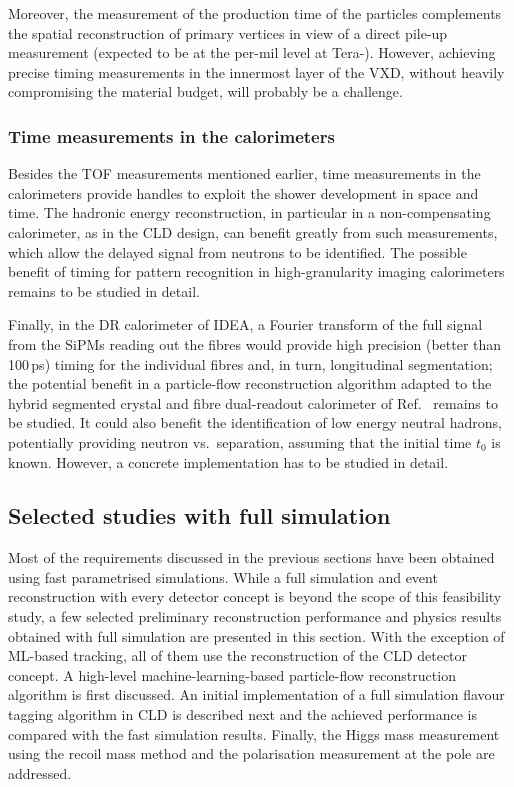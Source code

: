 Moreover, the measurement of the production time of the particles complements the spatial reconstruction of primary vertices in view of a direct pile-up measurement 
(expected to be at the per-mil level at Tera-\PZ). 
However, achieving precise timing measurements in the innermost layer of the VXD, without heavily compromising the material budget, will probably be a challenge.

\subsubsection{Time measurements in the calorimeters}

Besides the TOF measurements mentioned earlier, time measurements in the calorimeters provide handles to exploit the shower development in space and time. 
The hadronic energy reconstruction, in particular in a non-compensating calorimeter, as in the CLD design, can benefit greatly from such measurements, 
which allow the delayed signal from neutrons to be identified. 
The possible benefit of timing for pattern recognition in high-granularity imaging calorimeters remains to be studied in detail. 

Finally, in the DR calorimeter of IDEA, a Fourier transform of the full signal from the SiPMs reading out the fibres would provide high precision (better than 100\,ps) timing for the individual fibres and, 
in turn, longitudinal segmentation; 
the potential benefit in a particle-flow reconstruction algorithm adapted to the hybrid segmented crystal and fibre dual-readout calorimeter of Ref.~\cite{Lucchini:2020bac} remains to be studied. 
It could also benefit the identification of low energy neutral hadrons, potentially providing neutron vs.\ \PKL separation, 
assuming that the initial time $t_0$ is known. 
However, a concrete implementation has to be studied in detail.

\subsection{Selected studies with full simulation}
\label{sec:PhysPerf_FullSim}

Most of the requirements discussed in the previous sections have been obtained using fast parametrised simulations. 
While a full simulation and event reconstruction with every detector concept is beyond the scope of this feasibility study, 
a few selected preliminary reconstruction performance and physics results obtained with full simulation are presented in this section. 
With the exception of ML-based tracking, all of them use the reconstruction of the CLD detector concept. 
A high-level machine-learning-based particle-flow reconstruction algorithm is first discussed. 
An initial implementation of a full simulation flavour tagging algorithm in CLD is described next and the achieved performance is compared with the fast simulation results. 
Finally, the Higgs mass measurement using the recoil mass method and the \PGt polarisation measurement at the \PZ pole are addressed.

